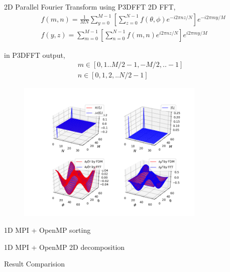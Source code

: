 \documentclass{beamer}
\begin{document}
\begin{frame}{2D Parallel Fourier Transform using P3DFFT}
	2D FFT,
	\begin{equation}
		\begin{aligned}
			&f(m,n) = \frac{1}{MN}
			\sum_{y=0}^{M-1}[\sum_{z=0}^{N-1}
			f(\theta,\phi)e^{-i2\pi{n}z/N}]e^{-i2\pi{m}y/M}	\\
			&f(y,z) = \sum_{m=0}^{M-1}[\sum_{n=0}^{N-1}
			f(m,n)e^{i2\pi{n}z/N}]e^{i2\pi{m}y/M}
		\end{aligned}
	\end{equation}

	in P3DFFT output,	
	\begin{equation}
		\begin{aligned}
			m\in[0,1..M/2-1,-M/2,..-1] \\
			n\in[0,1,2,..N/2-1]
		\end{aligned}
	\end{equation}
	
\end{frame}


\begin{frame}
	\begin{figure}[H]
		\centering
		\includegraphics[width=0.8\textwidth]{./images/2d_kd.png}
		\caption{}
	\end{figure}
\end{frame}


\begin{frame}{1D MPI + OpenMP}
	sorting 
\end{frame}

\begin{frame}{1D MPI + OpenMP}
	2D decomposition
\end{frame}

\begin{frame}{Result Comparision}
	
\end{frame}
\end{document}
